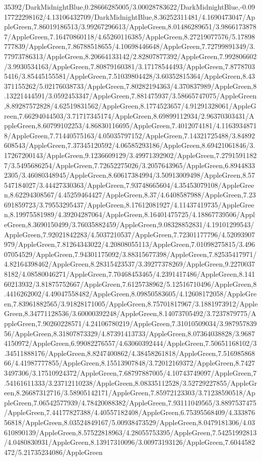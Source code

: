 {\begin{tikzternal}
35392/DarkMidnightBlue,0.28666285005/3.00028783622/DarkMidnightBlue,-0.0917722298162/4.13106432709/DarkMidnightBlue,8.36252311481/4.1690473047/AppleGreen,7.86019186513/3.99267296613/AppleGreen,8.01486289651/3.98661738787/AppleGreen,7.16470860118/4.65260116385/AppleGreen,8.27219077576/5.17898777839/AppleGreen,7.86788518655/4.10698446648/AppleGreen,7.72799891349/3.77973786313/AppleGreen,8.20664133142/2.82807877392/AppleGreen,7.992806602/3.9930534163/AppleGreen,7.80879160381/3.17178544493/AppleGreen,7.87787035416/3.85445155581/AppleGreen,7.51039804428/3.60352815364/AppleGreen,8.43371155262/5.02176038733/AppleGreen,7.80282194363/4.370837989/AppleGreen,8.13221444591/3.0592453347/AppleGreen,7.881475937/3.58665747075/AppleGreen,8.89287572828/4.62519831562/AppleGreen,8.1774523657/4.91291328061/AppleGreen,7.66294044503/3.71717345174/AppleGreen,8.69899112934/2.96370303431/AppleGreen,8.60799102253/4.86830116695/AppleGreen,7.4012074181/4.11639348718/AppleGreen,7.71440575163/4.05035797152/AppleGreen,7.14321725488/3.84892608543/AppleGreen,7.37345120592/4.06585293186/AppleGreen,8.69421061846/3.17267200143/AppleGreen,9.1236609129/3.49971392902/AppleGreen,7.27915911827/3.5495686254/AppleGreen,7.72652275026/3.2057643965/AppleGreen,6.89448332305/3.46080348945/AppleGreen,8.60617384994/3.50913009498/AppleGreen,8.57547184027/3.44427330363/AppleGreen,7.93748665604/4.35453079108/AppleGreen,8.62294308567/4.45259464427/AppleGreen,8.37/4.6408587988/AppleGreen,7.23691859723/3.79553295437/AppleGreen,8.17612081927/4.11437419735/AppleGreen,8.19975581989/4.39204287064/AppleGreen,8.16401475725/4.18867739506/AppleGreen,8.3690150499/3.76035882459/AppleGreen,9.08328852831/4.19101299543/AppleGreen,7.92021842283/4.5037210537/AppleGreen,7.72301177796/4.52093907979/AppleGreen,7.81264343022/4.20808055113/AppleGreen,7.01098275815/3.49607054529/AppleGreen,7.94301175092/3.88315677398/AppleGreen,7.82535417971/4.82164398462/AppleGreen,8.28315423537/3.39277378269/AppleGreen,9.22700378182/4.08580046271/AppleGreen,7.70468453465/4.2391417486/AppleGreen,8.14160213932/3.81875752667/AppleGreen,7.6125738962/5.12516710496/AppleGreen,8.4416262002/4.49047558482/AppleGreen,8.09850583605/4.12608172058/AppleGreen,7.83961882565/3.91828171005/AppleGreen,8.75701817967/3.1881973912/AppleGreen,8.34771128536/3.60000392248/AppleGreen,8.14073705492/3.7237879775/AppleGreen,7.90260228571/4.24106780219/AppleGreen,7.31010509034/3.98795783956/AppleGreen,8.31807873329/4.87391413733/AppleGreen,8.07364038828/3.96874150972/AppleGreen,6.99082276557/4.63060392444/AppleGreen,7.50651168102/3.34511888176/AppleGreen,8.8247400862/4.38458261818/AppleGreen,7.51698586866/4.41987777855/AppleGreen,8.15513907848/3.72012169372/AppleGreen,8.74273497306/3.17510924372/AppleGreen,7.68797887005/4.10743749097/AppleGreen,7.54161611333/3.23712110238/AppleGreen,8.08335112528/3.52729227855/AppleGreen,8.26687312716/3.58905142171/AppleGreen,7.85972123303/3.71238590518/AppleGreen,7.06542577939/4.78420088382/AppleGreen,7.93111049565/3.8897537475/AppleGreen,7.44177827388/4.40557182408/AppleGreen,6.75395568409/4.33387656818/AppleGreen,8.03524849167/5.00938473529/AppleGreen,8.0479181306/4.03610890139/AppleGreen,8.57522818963/4.28055753395/AppleGreen,7.54251992813/4.0480830931/AppleGreen,8.13917310096/3.00973193126/AppleGreen,7.6044582472/5.21735234086/AppleGreen
\end{tikzternal}}
